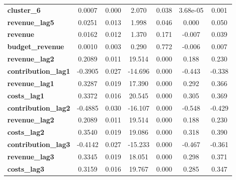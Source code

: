 \begin{center}
\begin{tabular}{lcccccc}
\textbf{cluster\_6}                       &       0.0007  &        0.000     &     2.070  &         0.038        &     3.68e-05    &        0.001     \\
\textbf{revenue\_lag5}                    &       0.0251  &        0.013     &     1.998  &         0.046        &        0.000    &        0.050     \\
\textbf{revenue}                          &       0.0162  &        0.012     &     1.370  &         0.171        &       -0.007    &        0.039     \\
\textbf{budget\_revenue}                  &       0.0010  &        0.003     &     0.290  &         0.772        &       -0.006    &        0.007     \\
\textbf{revenue\_lag2}                    &       0.2089  &        0.011     &    19.514  &         0.000        &        0.188    &        0.230     \\
\textbf{contribution\_lag1}               &      -0.3905  &        0.027     &   -14.696  &         0.000        &       -0.443    &       -0.338     \\
\textbf{revenue\_lag1}                    &       0.3287  &        0.019     &    17.390  &         0.000        &        0.292    &        0.366     \\
\textbf{costs\_lag1}                      &       0.3372  &        0.016     &    20.545  &         0.000        &        0.305    &        0.369     \\
\textbf{contribution\_lag2}               &      -0.4885  &        0.030     &   -16.107  &         0.000        &       -0.548    &       -0.429     \\
\textbf{revenue\_lag2}                    &       0.2089  &        0.011     &    19.514  &         0.000        &        0.188    &        0.230     \\
\textbf{costs\_lag2}                      &       0.3540  &        0.019     &    19.086  &         0.000        &        0.318    &        0.390     \\
\textbf{contribution\_lag3}               &      -0.4142  &        0.027     &   -15.233  &         0.000        &       -0.467    &       -0.361     \\
\textbf{revenue\_lag3}                    &       0.3345  &        0.019     &    18.051  &         0.000        &        0.298    &        0.371     \\
\textbf{costs\_lag3}                      &       0.3159  &        0.016     &    19.767  &         0.000        &        0.285    &        0.347     \\

\end{tabular}
\end{center}
